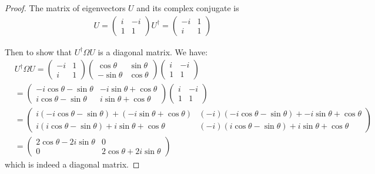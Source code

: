 \documentclass{article}
\begin{document}
\begin{proof}
    The matrix of eigenvectors $U$ and its complex conjugate is
    \begin{align}
        U = \begin{pmatrix}
        i & -i \\ 1 & 1
        \end{pmatrix}
        U^\dagger = \begin{pmatrix}
            -i & 1 \\ i & 1
        \end{pmatrix}
    \end{align}

    Then to show that $U^\dagger \Omega U$ is a diagonal matrix. We have:
    \begin{align}
        &U^\dagger \Omega U = \begin{pmatrix}
         -i & 1 \\ i & 1
        \end{pmatrix}
        \begin{pmatrix}
\cos \theta & \sin \theta \\ -\sin \theta & \cos \theta
        \end{pmatrix}
        \begin{pmatrix}
        i & -i \\ 1 & 1
        \end{pmatrix}  \\
        &= \begin{pmatrix}
            -i \cos \theta - \sin \theta & -i \sin \theta + \cos \theta \\ i \cos \theta - \sin \theta & i\sin \theta + \cos \theta 
        \end{pmatrix} \begin{pmatrix}
        i & -i \\ 1 & 1
        \end{pmatrix} \\
        &= \begin{pmatrix}
        i(-i \cos \theta - \sin \theta) + (-i \sin \theta + \cos \theta)  &
        (-i)(-i \cos \theta - \sin \theta) + -i \sin \theta + \cos \theta  \\
        i(i \cos \theta - \sin \theta) + i\sin \theta + \cos \theta  &
        (-i)(i \cos \theta - \sin \theta) + i\sin \theta + \cos \theta 
        \end{pmatrix} \\
        &= \begin{pmatrix}
            2\cos \theta - 2i \sin \theta & 0 \\
            0 &  2\cos \theta + 2i \sin \theta
        \end{pmatrix}
    \end{align}
    which is indeed a diagonal matrix. 
\end{proof}
\end{document}
